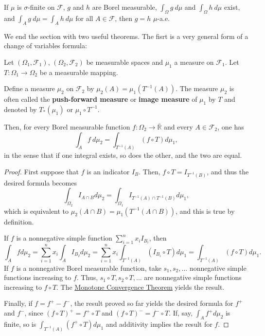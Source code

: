 \begin{corl}\label{corollary:equality of integrals implies equality of
functions} If \(\mu\) is \(\sigma\)-finite on \(\mathcal{F}\), \(g\) and \(h\) are Borel
measurable, \(\int_{\Omega}g~d\mu\) and \(\int_{\Omega}h~d\mu\) exist, and
\(\int_{A}g~d\mu=\int_{A}h~d\mu\) for all \(A\in\mathcal{F}\), then \(g=h\) \(\mu\)-a.e.
\end{corl}

We end the section with two useful theorems. The fisrt is a very general form of a change of
variables formula:
\begin{thrm}\label{theorem:Image Measure} Let
\(\left(\Omega_{1},\mathcal{F}_{1}\right)\), \(\left(\Omega_{2},\mathcal{F}_{2}\right)\) be
measurable spaces and \(\mu_{1}\) a measure on \(\mathcal{F}_{1}\). Let
\(T\colon\Omega_{1}\to\Omega_{2}\) be a measurable mapping.
	
	Define a measure \(\mu_{2}\) on \(\mathcal{F}_{2}\) by
\(\mu_{2}(A)=\mu_{1}(T^{-1}(A))\). The measure \(\mu_{2}\) is often called the
\textbf{push-forward measure} or \textbf{image measure} of \(\mu_{1}\) by \(T\)
and denoted by \(T_{*}(\mu_{1})\) or \(\mu_{1}\circ T^{-1}\).
	
	Then, for every Borel measurable function
\(f\colon\Omega_{2}\to\overline{\mathbb{R}}\) and every \(A\in\mathcal{F}_{2}\), one has
	\[ \int_{A}f~d\mu_{2}=\int_{T^{-1}(A)}\left(f\circ T\right)d\mu_{1},
	\] in the sense that if one integral exists, so does the other, and the two
are equal.
\end{thrm}
\begin{proof} First suppose that \(f\) is an indicator \(I_{B}\). Then,
\(f\circ T=I_{T^{-1}(B)}\), and thus the desired formula becomes
\[\int_{\Omega_{2}}I_{A\cap B}d\mu_{2}=\int_{\Omega_{1}}I_{T^{-1}(A)\cap T^{-1}(B)}d\mu_{1},\] which is equivalent to \(\mu_{2}(A\cap B)=\mu_{1}(T^{-1}(A\cap B))\), and
this is true by definition.
	
If \(f\) is a nonnegative simple function \(\sum_{i=1}^{n}x_{i}I_{B_{i}}\),
then
\[\int_{A}fd\mu_{2}=\sum_{i=1}^{n}x_{i}\int_{A}I_{B_{I}}d\mu_{2}=\sum_{i=1}^{n}x_{i}\int_{T^{-1}(A)}\left(I_{B_{i}}\circ T\right)d\mu_{1}=\int_{T^{-1}(A)}\left(f\circ T\right)d\mu_{1}.\]
If \(f\) is a nonnegative Borel measurable function, take
\(s_{1},s_{2},\dots\) nonnegative simple functions increasing to \(f\). Thus,
\(s_{1}\circ T, s_{2}\circ T,\dots\) are nonnegative simple functions increasing
to \(f\circ T\). The \hyperref[theorem:Monotone Convergence]{Monotone Convergence
Theorem} yields the result.

Finally, if \(f=f^+-f^-\), the result proved so far yields the desired
formula for \(f^+\) and \(f^-\), since \((f\circ T)^+=f^+\circ T\) and
\((f\circ T)^-=f^-\circ T\). If, say, \(\int_{A}f^+d\mu_{2}\) is finite, so is
\(\int_{T^{-1}(A)}\left(f^+\circ T\right)d\mu_{1}\) and additivity implies the
result for \(f\).
\end{proof}
